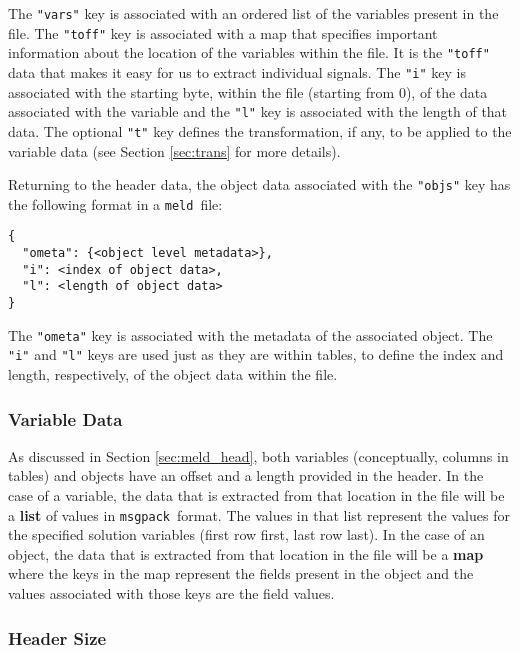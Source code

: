 \documentclass[11pt,a4paper,twocolumn]{article}
\newcommand{\meld}{\texttt{meld}}
\newcommand{\msgpack}{\texttt{msgpack}}
\newcommand{\code}[1]{\texttt{#1}} %
\begin{document}
The \code{"vars"} key is associated with an ordered list of the
variables present in the file.  The \code{"toff"} key is associated
with a map that specifies important information about the location of
the variables within the file.  It is the \code{"toff"} data that
makes it easy for us to extract individual signals.  The \code{"i"}
key is associated with the starting byte, within the file (starting
from 0), of the data associated with the variable and the \code{"l"}
key is associated with the length of that data.  The optional
\code{"t"} key defines the transformation, if any, to be applied to
the variable data (see Section \ref{sec:trans} for more details).

Returning to the header data, the object data associated with the
\code{"objs"} key has the following format in a \meld\ file:

\begin{verbatim}
{
  "ometa": {<object level metadata>},
  "i": <index of object data>,
  "l": <length of object data>
}
\end{verbatim}

The \code{"ometa"} key is associated with the metadata of the
associated object.  The \code{"i"} and \code{"l"} keys are used just
as they are within tables, to define the index and length,
respectively, of the object data within the file.

\subsubsection{Variable Data}

As discussed in Section \ref{sec:meld_head}, both variables
(conceptually, columns in tables) and objects have an offset and a
length provided in the header.  In the case of a variable, the data
that is extracted from that location in the file will be a
\textbf{list} of values in \msgpack\ format.  The values in that list
represent the values for the specified solution variables (first row
first, last row last).  In the case of an object, the data that is
extracted from that location in the file will be a \textbf{map} where
the keys in the map represent the fields present in the object and the
values associated with those keys are the field values.

\subsubsection{Header Size}

\end{document}
